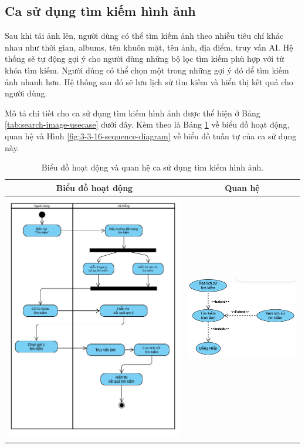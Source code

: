 \subsection{Ca sử dụng tìm kiếm hình ảnh}

Sau khi tải ảnh lên, người dùng có thể tìm kiếm ảnh theo nhiều tiêu chí khác nhau như thời gian, albums, tên khuôn mặt, tên ảnh, địa điểm, truy vấn AI. Hệ thống sẽ tự động gợi ý cho người dùng những bộ lọc tìm kiếm phù hợp với từ khóa tìm kiếm. Người dùng có thể chọn một trong những gợi ý đó để tìm kiếm ảnh nhanh hơn. Hệ thống sau đó sẽ lưu lịch sử tìm kiếm và hiển thị kết quả cho người dùng. 

Mô tả chi tiết cho ca sử dụng tìm kiếm hình ảnh được thể hiện ở Bảng \ref{tab:search-image-usecase} dưới đây. Kèm theo là Bảng \ref{tab:search-image-usecase-activity} về biểu đồ hoạt động, quan hệ và Hình \ref{fig:3-3-16-sequence-diagram} về biểu đồ tuần tự của ca sử dụng này. 

\noindent 
\begin{table}[H]
\centering
\begin{tabular}{| c | c |}
    \hline
    \textbf{Biểu đồ hoạt động} & \textbf{Quan hệ} \\ 
    \hline
    \includegraphics[width=0.6\linewidth]{figures/c3/3-3-16-activity-diagram.png} 
    &  
    \includegraphics[width=0.35\linewidth]{figures/c3/3-3-16-relationship.png} \\ 
    \hline
\end{tabular}
\caption{Biểu đồ hoạt động và quan hệ ca sử dụng tìm kiếm hình ảnh.}
\label{tab:search-image-usecase-activity}
\end{table}

